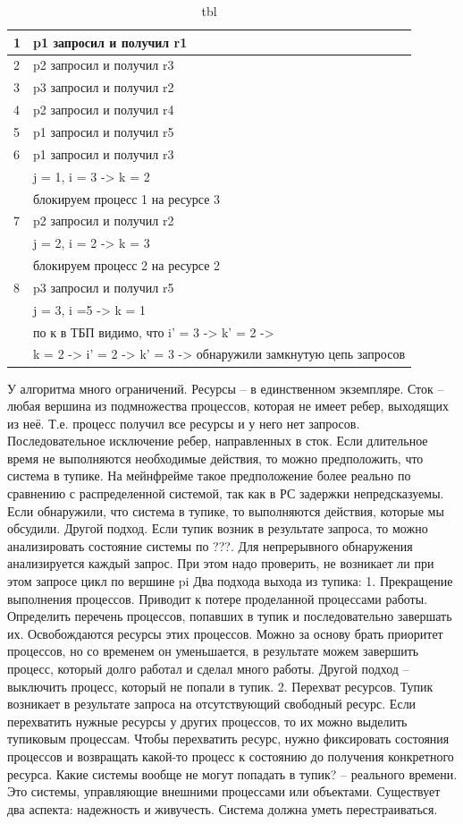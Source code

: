 \begin{table}[H]
\caption{tbl}
\begin{tabular}{|l|l|}
1 &  p1 запросил и получил r1\\
\hline
2 &  p2 запросил и получил r3\\
\hline
3 &  p3 запросил и получил r2\\
\hline
4 &  p2 запросил и получил r4\\
\hline
5 &  p1 запросил и получил r5\\
\hline
6 &  p1 запросил и получил r3\\
 & j = 1, i = 3 -> k = 2 \\
 & блокируем процесс 1 на ресурсе 3\\
\hline
7 &  p2 запросил и получил r2\\
 & j = 2, i = 2 -> k = 3\\
 & блокируем процесс 2 на ресурсе 2\\
\hline
8 &  p3 запросил и получил r5\\
 & j = 3, i =5 -> k = 1\\
 & по к в ТБП видимо, что i’ = 3 -> k’ = 2 ->\\
 & k = 2 -> i’ = 2 -> k’ = 3  -> обнаружили замкнутую цепь запросов\\
\end{tabular}
\end{table}

У алгоритма много ограничений. Ресурсы – в единственном экземпляре.
Сток – любая вершина из подмножества процессов, которая не имеет ребер, выходящих из неё. Т.е. процесс получил все ресурсы и у него нет запросов. 
Последовательное исключение ребер, направленных в сток. Если длительное время не выполняются необходимые действия, то можно предположить, что система в тупике. На мейнфрейме такое предположение более реально по сравнению с распределенной системой, так как в РС задержки непредсказуемы.  Если обнаружили, что система в тупике, то выполняются действия, которые мы обсудили. 
Другой подход. Если тупик возник в результате запроса, то можно анализировать состояние системы по ???. 
Для непрерывного обнаружения анализируется каждый запрос. При этом надо проверить, не возникает ли при этом запросе цикл по вершине pi 
Два подхода выхода из тупика:
1. Прекращение выполнения процессов. Приводит к потере проделанной процессами работы.
Определить перечень процессов, попавших в тупик и последовательно завершать их. Освобождаются ресурсы этих процессов. Можно за основу брать приоритет процессов, но со временем он уменьшается, в результате можем завершить процесс, который долго работал и сделал много работы. Другой подход – выключить процесс, который не попали в тупик. 
2. Перехват ресурсов. Тупик возникает в результате запроса на отсутствующий свободный ресурс. Если перехватить нужные ресурсы у других процессов, то их можно выделить тупиковым процессам. Чтобы перехватить ресурс, нужно фиксировать состояния процессов и возвращать какой-то процесс к состоянию до получения конкретного ресурса.
Какие системы вообще не могут попадать в тупик? – реального времени. Это системы, управляющие внешними процессами или объектами. 
Существует два аспекта: надежность и живучесть. Система должна уметь перестраиваться.

